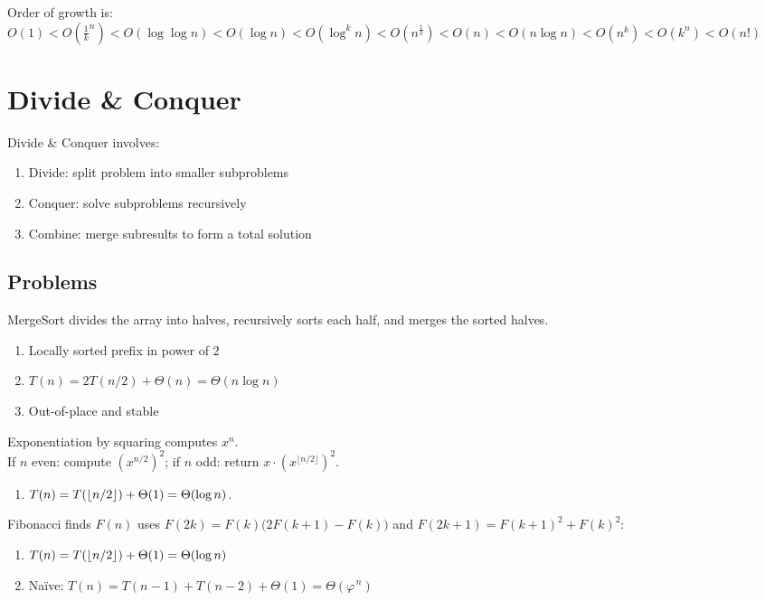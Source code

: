 \documentclass[12pt, a4paper]{article}
\begin{document}
\begin{multicols*}{3}
Order of growth is:\\
$O(1) < O(\frac{1}{k}^n) < O(\log\log n) < O(\log n) < O(\log^k n) < O(n^{\frac{1}{k}}) < O(n) < O(n\log n) < O(n^k) < O(k^n) < O(n!)$


\colbreak

\section{Divide \& Conquer}

Divide \& Conquer involves:
\begin{enumerate}[\roman*.]
  \item Divide: split problem into smaller subproblems
  \item Conquer: solve subproblems recursively
  \item Combine: merge subresults to form a total solution
\end{enumerate}

\subsection{Problems}

MergeSort divides the array into halves, recursively sorts each half, and merges the sorted halves.
\begin{enumerate}[\roman*.]
  \item Locally sorted prefix in power of 2
  \item $T(n) = 2T(n /2) + \Theta(n) = \Theta(n\log n)$
  \item Out-of-place and stable
\end{enumerate}

Exponentiation by squaring computes $x^n$.\\If $n$ even: compute $(x^{n/2})^2$; if $n$ odd: return $x \cdot (x^{\lfloor n/2\rfloor})^2$. 
\begin{enumerate}[\roman*.]
  \item $T(n)=T(\lfloor n/2 \rfloor)+\Theta(1)=\Theta(\log n)$.
\end{enumerate}

Fibonacci finds $F(n)$ uses $F(2k)=F(k)\big(2F(k{+}1)-F(k)\big)$ and
$F(2k{+}1)=F(k{+}1)^2+F(k)^2$:
\begin{enumerate}[\roman*.]
  \item $T(n)=T(\lfloor n/2 \rfloor)+\Theta(1)=\Theta(\log n)$
  \item Naïve: $T(n)=T(n-1)+T(n-2)+\Theta(1)=\Theta(\varphi^{\,n})$
\end{enumerate}


\end{multicols*}
\end{document}
